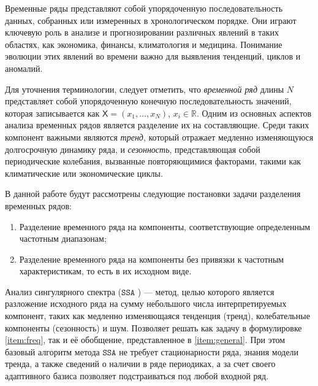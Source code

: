 \documentclass[12pt, specialist, subf
]{disser}
\date{}
\theoremstyle{definition}
\newcommand{\SSA}{\texttt{SSA}}
\newcommand{\TS}{\mathsf{X}}
\begin{document}
%


\tableofcontents
\noindent

\newpage


\intro


Временные ряды представляют собой упорядоченную последовательность данных, собранных или измеренных в хронологическом порядке. Они играют ключевую роль в анализе и прогнозировании различных явлений в таких областях, как экономика, финансы, климатология и медицина. Понимание эволюции этих явлений во времени важно для выявления тенденций, циклов и аномалий.

Для уточнения терминологии, следует отметить, что \textit{временной ряд} длины \( N \) представляет собой упорядоченную конечную последовательность значений, которая записывается как \( \TS = (x_1, \dots, x_{N}) \), $x_i \in \mathbb{R}$. Одним из основных аспектов анализа временных рядов является разделение их на составляющие. Среди таких компонент важными являются \textit{тренд}, который отражает медленно изменяющуюся долгосрочную динамику ряда, и \textit{сезонность}, представляющая собой периодические колебания, вызванные повторяющимися факторами, такими как климатические или экономические циклы.


В данной работе будут рассмотрены следующие постановки задачи разделения временных рядов:
\begin{enumerate}
	\item \label{item:freq} Разделение временного ряда на компоненты, соответствующие определенным частотным диапазонам;
	\item \label{item:general} Разделение временного ряда на компоненты без привязки к частотным характеристикам, то есть в их исходном виде.
\end{enumerate}


Анализ сингулярного спектра ($\SSA$ \cite{golyandina2001analysis}) --- метод, целью которого является разложение исходного ряда на сумму небольшого числа интерпретируемых компонент, таких как медленно изменяющаяся тенденция (тренд), колебательные компоненты (сезонность) и шум. Позволяет решать как задачу в формулировке \ref{item:freq}, так и её обобщение, представленное в \ref{item:general}. При этом базовый алгоритм метода $\SSA$ не требует стационарности ряда, знания модели тренда, а также сведений о наличии в ряде периодиках, а за счет своего адаптивного базиса позволяет подстраиваться под любой входной ряд.
\end{document}
